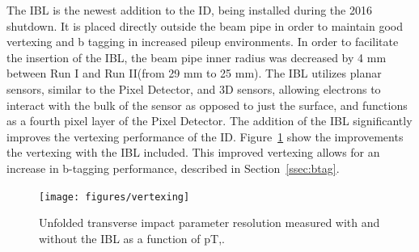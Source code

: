 \indent The IBL is the newest addition to the ID, being installed during the 2016 shutdown. It is placed directly outside the beam pipe in order to maintain good vertexing and b tagging in increased pileup environments. In order to facilitate the insertion of the IBL, the beam pipe inner radius was decreased by 4 mm between Run I and Run II(from 29 mm to 25 mm). The IBL utilizes planar sensors, similar to the Pixel Detector, and 3D sensors, allowing electrons to interact with the bulk of the sensor as opposed to just the surface, and functions as a fourth pixel layer of the Pixel Detector. The addition of the IBL significantly improves the vertexing performance of the ID. Figure~\ref{fig:iblbtag} show the improvements the vertexing with the IBL included. This improved vertexing allows for an increase in b-tagging performance, described in Section~\ref{ssec:btag}.


\begin{figure}[h]
\begin{center}
\texttt{[image: figures/vertexing]}
\caption[Vertexing improvements with the IBL]{Unfolded transverse impact parameter resolution measured with and without the IBL as a function of pT,.\cite{trackplot}}
\label{fig:iblbtag}
\end{center}
\end{figure}


